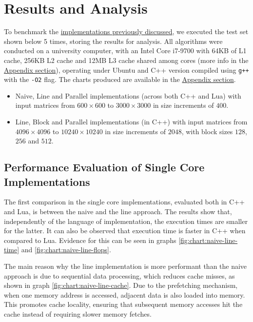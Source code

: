 \section{Results and Analysis} \label{section:results}

To benchmark the \hyperref[section:algorithms]{implementations previously discussed}, we executed the test set shown below 5 times, storing the results for analysis. All algorithms were conducted on a university computer, with an Intel Core i7-9700 with 64KB of L1 cache, 256KB L2 cache and 12MB L3 cache shared among cores (more info in the \hyperref[section:appendix:pc_specs]{Appendix section}), operating under Ubuntu and C++ version compiled using \verb|g++| with the \verb|-O2| flag. The charts produced are available in the \hyperref[section:appendix]{Appendix section}.

\begin{itemize}
    \item Naive, Line and Parallel implementations (across both C++ and Lua) with input matrices from $600 \times 600$ to $3000 \times 3000$ in size increments of $400$.
    \item Line, Block and Parallel implementations (in C++) with input matrices from $4096 \times 4096$ to $10240 \times 10240$ in size increments of $2048$, with block sizes $128$, $256$ and $512$.
\end{itemize}

\subsection{Performance Evaluation of Single Core Implementations}

The first comparison in the single core implementations, evaluated both in C++ and Lua, is between the naive and the line approach. The results show that, independently of the language of implementation, the execution times are smaller for the latter. It can also be observed that execution time is faster in C++ when compared to Lua. Evidence for this can be seen in graphs \ref{fig:chart:naive-line-time} and \ref{fig:chart:naive-line-flops}.

The main reason why the line implementation is more performant than the naive approach is due to sequential data processing, which reduces cache misses, as shown in graph \ref{fig:chart:naive-line-cache}. Due to the prefetching mechanism, when one memory address is accessed, adjacent data is also loaded into memory. This promotes cache locality, ensuring that subsequent memory accesses hit the cache instead of requiring slower memory fetches.

